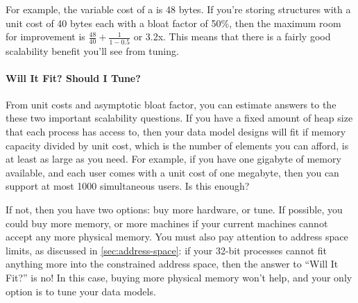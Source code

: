 For example, the variable cost of a  is 48 bytes. If you're
storing structures with a unit cost of 40 bytes each with a bloat factor of
50\%, then the maximum room for improvement is $\frac{48}{40} + \frac{1}{1-0.5}$
or 3.2x. This means that there is a fairly good scalability benefit you'll see from
tuning.


\paragraph{Will It Fit? Should I Tune?}

From unit costs and asymptotic bloat factor, you can estimate answers to the
these two important scalability questions. If you have a fixed amount of heap
size that each process has access to, then your data model designs will fit if
memory capacity divided by unit cost, which is the number of elements you can
afford, is at least as large as you need. For example, if you have one gigabyte
of memory available, and each user comes with a unit cost of one megabyte, then
you can support at most 1000 simultaneous users. Is this enough? 

\begin{figure}
\end{figure}

If not, then you have two options: buy more hardware, or tune. If possible, you
could buy more memory, or more machines if your current machines cannot accept
any more physical memory. You must also pay attention to address space limits,
as discussed in \autoref{sec:address-space}: if your 32-bit processes cannot fit
anything more into the constrained address space, then the answer to ``Will It
Fit?'' is no! In this case, buying more physical memory won't help, and your only
option is to tune your data models.

